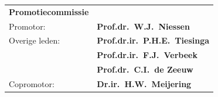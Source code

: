 
\newpage
\thispagestyle{empty}
\label{othersideformal}

\begin{tabular}{@{}ll@{}}
\large\bf{Promotiecommissie} &\\ [8ex]
Promotor:      & {\bf Prof.dr.~W.J.~Niessen}\\[3ex]
Overige leden: & {\bf Prof.dr.ir.~P.H.E.~Tiesinga}\\[1ex]
               & {\bf Prof.dr.ir.~F.J.~Verbeek}\\[1ex]
               & {\bf Prof.dr.~C.I.~de Zeeuw}\\[3ex]
Copromotor:    & {\bf Dr.ir.~H.W.~Meijering}\\
\end{tabular}
